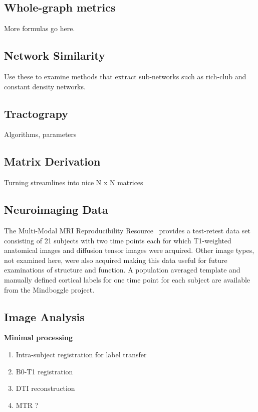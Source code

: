 \documentclass{frontiersSCNS} %
\begin{document}
\subsection{Whole-graph metrics}
More formulas go here.

\subsection{Network Similarity}
Use these to examine methods that extract sub-networks such as rich-club and constant density networks.


\subsection{Tractograpy}
Algorithms, parameters

\subsection{Matrix Derivation}
Turning streamlines into nice N x N matrices

\subsection{Neuroimaging Data}
The Multi-Modal MRI Reproducibility Resource~\cite{kirby} provides a test-retest data set consisting of 21 subjects with two time points each for which T1-weighted anatomical images and diffusion tensor images were acquired. Other image types, not examined here, were also acquired making this data useful for future examinations of structure and function.  A population averaged template and manually defined cortical labels for one time point for each subject are available from the Mindboggle project.

\subsection{Image Analysis}

\textbf{Minimal processing}
\begin{enumerate}
\item Intra-subject registration for label transfer
\item B0-T1 registration
\item DTI reconstruction
\item MTR ?
\end{enumerate}
\end{document}
